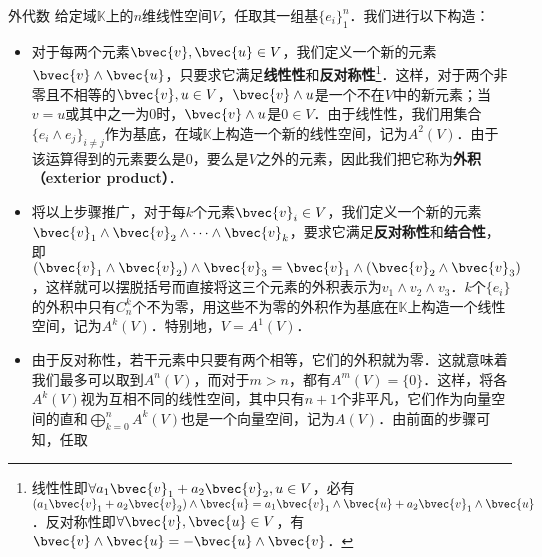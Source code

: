 \begin{example}{外代数}
给定域$\mathbb{K}$上的$n$维线性空间$V$，任取其一组基$\{e_i\}^n_{1}$．我们进行以下构造：
\begin{itemize}
\item 对于每两个元素$\bvec{v}, \bvec{u}\in V$，我们定义一个新的元素$\bvec{v}\wedge \bvec{u}$，只要求它满足\textbf{线性性}和\textbf{反对称性}\footnote{线性性即$\forall a_1\bvec{v}_1+a_2\bvec{v}_2,{u}\in V$，必有$(a_1\bvec{v}_1+a_2\bvec{v}_2)\wedge\bvec{u}=a_1\bvec{v}_1\wedge\bvec{u}+a_2\bvec{v}_1\wedge\bvec{u}$．反对称性即$\forall \bvec{v}, \bvec{u}\in V$，有$\bvec{v}\wedge\bvec{u}=-\bvec{u}\wedge\bvec{v}$．}．这样，对于两个非零且不相等的$\bvec{v},u\in V$，$\bvec{v}\wedge u$是一个不在$V$中的新元素；当$v=u$或其中之一为$0$时，$\bvec{v}\wedge u$是$0\in V$．由于线性性，我们用集合$\{e_i\wedge e_j\}_{i\not=j}$作为基底，在域$\mathbb{K}$上构造一个新的线性空间，记为$A^2(V)$．由于该运算得到的元素要么是$0$，要么是$V$之外的元素，因此我们把它称为\textbf{外积（exterior product）}．

\item 将以上步骤推广，对于每$k$个元素$\bvec{v}_i\in V$，我们定义一个新的元素$\bvec{v}_1\wedge \bvec{v}_2\wedge\cdots\wedge \bvec{v}_k$，要求它满足\textbf{反对称性}和\textbf{结合性}，即$(\bvec{v}_1\wedge \bvec{v}_2)\wedge \bvec{v}_3=\bvec{v}_1\wedge(\bvec{v}_2\wedge \bvec{v}_3)$，这样就可以摆脱括号而直接将这三个元素的外积表示为$v_1\wedge v_2\wedge v_3$．$k$个$\{e_i\}$的外积中只有$C^k_n$个不为零，用这些不为零的外积作为基底在$\mathbb{K}$上构造一个线性空间，记为$A^k(V)$．特别地，$V=A^1(V)$．

\item 由于反对称性，若干元素中只要有两个相等，它们的外积就为零．这就意味着我们最多可以取到$A^n(V)$，而对于$m>n$，都有$A^m(V)=\{0\}$．这样，将各$A^k(V)$视为互相不同的线性空间，其中只有$n+1$个非平凡，它们作为向量空间的直和$\bigoplus\limits_{k=0}^n A^k(V)$也是一个向量空间，记为$A(V)$．由前面的步骤可知，任取
\end{itemize}


\end{example}
